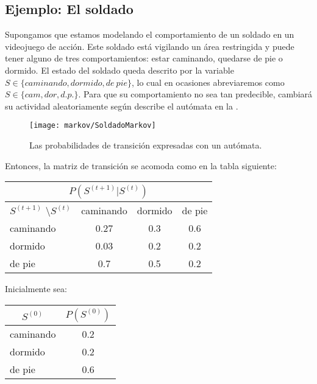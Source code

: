 \subsection{Ejemplo: El soldado}

Supongamos que estamos modelando el comportamiento de un soldado en un videojuego de acción.  Este soldado está vigilando un área restringida y puede tener alguno de tres comportamientos: estar caminando, quedarse de pie o dormido.  El estado del soldado queda descrito por la variable $S \in \{caminando, dormido, de\ pie\}$, lo cual en ocasiones abreviaremos como $S \in \{cam, dor, d.p.\}$.  Para que su comportamiento no sea tan predecible, cambiará su actividad aleatoriamente según describe el autómata en la .

\begin{figure}
 \centering
 \texttt{[image: markov/SoldadoMarkov]}
 \caption{Las probabilidades de transición expresadas con un autómata.}\label{Fig:SoldadoMarkov}
\end{figure}

Entonces, la matriz de transición se acomoda como en la tabla siguiente:

 \begin{center}
 \begin{tabular}{l|ccc}
  \multicolumn{4}{c}{$P(S^{(t+1)}|S^{(t)})$} \\ \hline
  $S^{(t+1)}$ \textbackslash $S^{(t)}$          & caminando & dormido & de pie \\ \hline
  caminando &    0.27   &    0.3  & 0.6 \\
  dormido   &    0.03   &    0.2  & 0.2 \\
  de pie    &    0.7    &    0.5  & 0.2
 \end{tabular}
 \end{center}

 Inicialmente sea:

 \begin{center}
 \begin{tabular}{l|c}
  \multicolumn{1}{c|}{$S^{(0)}$}   &  $P(S^{(0)})$ \\ \hline
  caminando &    0.2 \\
  dormido   &    0.2 \\
  de pie    &    0.6
 \end{tabular}
 \end{center}

